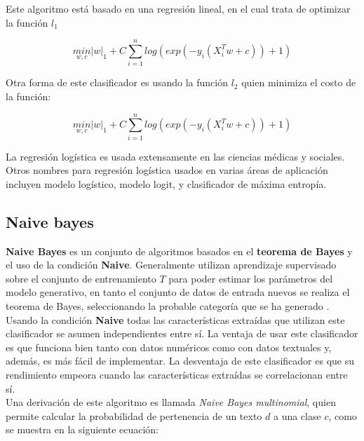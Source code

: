 Este algoritmo está basado en una regresión lineal, en el cual trata de optimizar la función $l_1$

\begin{equation}
\underset{w,c}{min}{\left|w\right|}_1+C\sum_{i=1}^{n}log(exp(-y_i(X_{i}^{T} w+c ))+1)
\end{equation}

Otra forma de este clasificador es usando la función $l_2$ quien minimiza el costo de la función:

\begin{equation}
\underset{w,c}{min}{\left|w\right|}_1+C\sum_{i=1}^{n}log(exp(-y_i(X_{i}^{T} w+c ))+1)
\end{equation}

La regresión logística es usada extensamente en las ciencias médicas y sociales. Otros nombres para regresión logística usados en varias áreas de 
aplicación incluyen modelo logístico, modelo logit, y clasificador de máxima entropía.


\subsection{Naive bayes}


\textbf{Naive Bayes} es un conjunto de algoritmos basados en el \textbf{teorema de Bayes} y el uso de la condición \textbf{Naive}. Generalmente utilizan aprendizaje supervisado sobre el conjunto de entrenamiento  $T$ para poder estimar los parámetros 
del modelo generativo, en tanto el conjunto de datos de entrada nuevos se realiza el teorema de Bayes, seleccionando la probable categoría 
que se ha generado \citep{CT7}.\\


Usando la condición \textbf{Naive} todas las características extraídas que utilizan este clasificador se asumen independientes entre sí. La ventaja de usar este clasificador es que 
funciona bien tanto con datos numéricos como con datos textuales y, además, es más fácil de implementar. La desventaja de este clasificador es 
que su rendimiento empeora cuando las características extraídas se correlacionan entre sí.\\

Una derivación de este algoritmo es llamada \textit{Naive Bayes multinomial}, quien permite calcular la probabilidad de pertenencia de un texto $d$ a una clase $c$, como se muestra en la siguiente ecuación:\\

